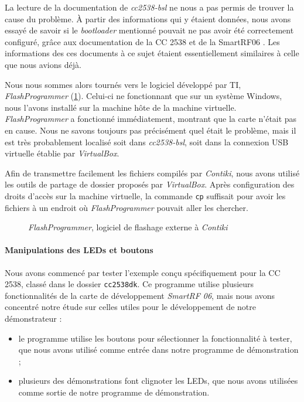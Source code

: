 La lecture de la documentation de \emph{cc2538-bsl}  ne nous a pas permis de trouver la cause du problème.
À partir des informations qui y étaient données, nous avons essayé de savoir si le \textit{bootloader} mentionné pouvait ne pas avoir été correctement configuré, grâce aux documentation de la CC 2538 \cite{cc2538-user-guide} et de la SmartRF06 \cite{smartrf06-user-guide}.
Les informations des ces documents à ce sujet étaient essentiellement similaires à celle que nous avions déjà.

Nous nous sommes alors tournés vers le logiciel développé par TI, \emph{FlashProgrammer} (\cref{flashprogrammer}).
Celui-ci ne fonctionnant que sur un système Windows, nous l’avons installé sur la machine hôte de la machine virtuelle.
\emph{FlashProgrammer} a fonctionné immédiatement, montrant que la carte n’était pas en cause.
Nous ne savons toujours pas précisément quel était le problème, mais il est très probablement localisé soit dans \emph{cc2538-bsl}, soit dans la connexion USB virtuelle établie par \emph{VirtualBox}.

Afin de transmettre facilement les fichiers compilés par \emph{Contiki}, nous avons utilisé les outils de partage de dossier proposés par \emph{VirtualBox}.
Après configuration des droits d’accès sur la machine virtuelle, la commande \texttt{cp} suffisait pour avoir les fichiers à un endroit où \emph{FlashProgrammer} pouvait aller les chercher.

\begin{figure}[H]
\centering
{}
\caption{\emph{FlashProgrammer}, logiciel de flashage externe à \emph{Contiki}}
\label{flashprogrammer}
\end{figure}

\paragraph{Manipulations des LEDs et boutons}

Nous avons commencé par tester l’exemple conçu spécifiquement pour la CC 2538, classé dans le dossier \texttt{cc2538dk}.
Ce programme utilise plusieurs fonctionnalités de la carte de développement \emph{SmartRF 06}, mais nous avons concentré notre étude sur celles utiles pour le développement de notre démonstrateur :

\begin{itemize}
	\item le programme utilise les boutons pour sélectionner la fonctionnalité à tester, que nous avons utilisé comme entrée dans notre programme de démonstration ;
	\item plusieurs des démonstrations font clignoter les LEDs, que nous avons utilisées comme sortie de notre programme de démonstration.
\end{itemize}

